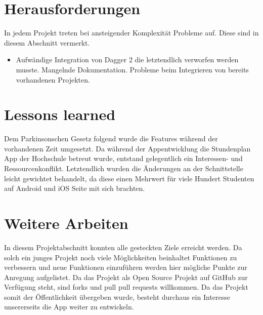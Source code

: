 \documentclass[
    DIV12,
    cleardouble=plain,
    headings=normal,
    pdftex,
    headexclude,footexclude,
    final
]{scrreprt}
\begin{document}
\newpage

\chapter{Herausforderungen}
In jedem Projekt treten bei ansteigender Komplexität Probleme auf. Diese sind in diesem Abschnitt vermerkt.

\begin{itemize}
\item Aufwändige Integration von Dagger 2 die letztendlich verworfen werden musste. Mangelnde Dokumentation. Probleme beim Integrieren von bereits vorhandenen Projekten.
\end{itemize}

\newpage

\chapter{Lessons learned}
Dem Parkinsonschen Gesetz folgend wurde die Features während der vorhandenen Zeit umgesetzt. Da während der Appentwicklung die Stundenplan App der Hochschule betreut wurde, entstand gelegentlich ein Interessen- und Ressourcenkonflikt. Letztendlich wurden die Änderungen an der Schnittstelle leicht gewichtet behandelt, da diese einen Mehrwert für viele Hundert Studenten auf Android und iOS Seite mit sich brachten.


\newpage

\chapter{Weitere Arbeiten}
In diesem Projektabschnitt konnten alle gesteckten Ziele erreicht werden. Da solch ein junges Projekt noch viele Möglichkeiten beinhaltet Funktionen zu verbessern und neue Funktionen einzuführen werden hier mögliche Punkte zur Anregung aufgelistet. Da das Projekt als Open Source Projekt auf GitHub zur Verfügung steht, sind forks und pull pull requests willkommen. Da das Projekt somit der Öffentlichkeit übergeben wurde, besteht durchaus ein Interesse unsererseits die App weiter zu entwickeln.





\newpage


\listoffigures
\end{document}
